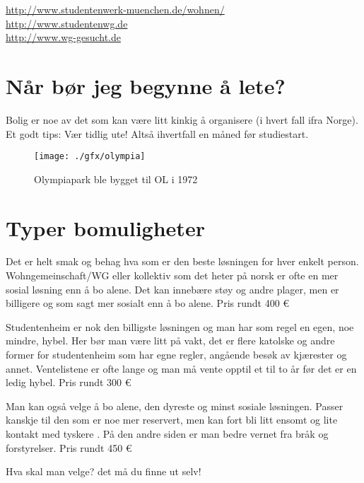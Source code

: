 \url{http://www.studentenwerk-muenchen.de/wohnen/}\\
\url{http://www.studentenwg.de}\\
\url{http://www.wg-gesucht.de}





\section{Når bør jeg begynne å lete?}
Bolig er noe av det som kan være litt kinkig å organisere (i hvert fall ifra Norge). Et godt tips: Vær tidlig ute! Altså ihvertfall en måned før studiestart.


\begin{figure}[h]
\center
\texttt{[image: ./gfx/olympia]}
\caption{Olympiapark ble bygget til OL i 1972}
\end{figure}


\section{Typer bomuligheter}
Det er helt smak og behag hva som er den beste løsningen for hver enkelt person. Wohngemeinschaft/WG eller kollektiv som det heter på norsk er ofte en mer sosial løsning enn å bo alene. Det kan innebære støy og andre plager, men er billigere og som sagt mer sosialt enn å bo alene. Pris rundt 400 \euro{}

Studentenheim er nok den billigste løsningen og man har som regel en egen, noe mindre, hybel. Her bør man være litt på vakt, det er flere katolske og andre former for studentenheim som har egne regler, angående besøk av kjærester og annet.
Ventelistene er ofte lange og man må vente opptil et til to år før det er en ledig hybel.
Pris rundt 300 \euro{}

Man kan også velge å bo alene, den dyreste og minst sosiale løsningen. Passer kanskje til den som er noe mer reservert, men kan fort bli litt ensomt og lite kontakt med tyskere . På den andre siden er man bedre vernet fra bråk og forstyrelser.
Pris rundt 450 \euro{}

Hva skal man velge? det må du finne ut selv!


